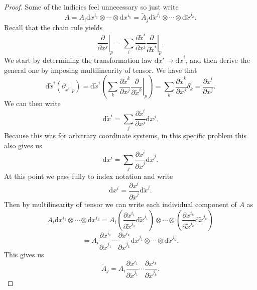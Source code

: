 \documentclass[11pt, letterpaper]{article}
\begin{document}
\begin{proof}
	Some of the indicies feel unnecessary so just write
	\[
		A=A_i \mathrm{d} x^{i_1} \otimes \cdots \otimes \mathrm{d} x^{i_k}  = \widetilde{A}_j \mathrm{d} \widetilde{x}^{j_1} \otimes \cdots \otimes \mathrm{d} \widetilde{x}^{j_k} 
	.\]
	Recall that the chain rule yields
	\[
		\left.\frac{\partial }{\partial x ^j} \right|_p = \sum_{i} \frac{\partial \widetilde{x} ^i}{\partial x^j} \left.\frac{\partial }{\partial \widetilde{x} ^i}\right|_p 
	.\]
	We start by determining the transformation law $\mathrm{d}x^i \to \mathrm{d} \widetilde{x} ^i $, and then derive the general one by imposing multilinearity of tensor. We have that
	\[
		\mathrm{d} \widetilde{x}^i(\partial _{x^{^j} } |_p)=\mathrm{d} \widetilde{x}^i \left( \sum_{k} \frac{\partial \widetilde{x} ^k}{\partial x ^j} \left.\frac{\partial }{\partial \widetilde{x}^k} \right|_p \right) =	\sum_{k} \frac{\partial \widetilde{x} ^k}{\partial x ^j} \delta ^i_k = \frac{\partial \widetilde{x}^i}{\partial x^j} 
	.\]
	We can then write
	\[
		\mathrm{d} \widetilde{x} ^i = \sum_{j} \frac{\partial \widetilde{x} ^i}{\partial x^j} \mathrm{d} x^j
	.\]
	Because this was for arbitrary coordinate systems, in this specific problem this also gives us
	\[
		\mathrm{d} x^i = \sum_{j} \frac{\partial x ^i}{\partial \widetilde{x}^j} \mathrm{d} \widetilde{x} ^j
	.\]
	At this point we pass fully to index notation and write
	\[
		\mathrm{d} x^i =  \frac{\partial x ^i}{\partial \widetilde{x}^j} \mathrm{d} \widetilde{x}^j
	.\]
	Then by multilinearity of tensor we can write each individual component of $A$ as
	\[
		A_i \mathrm{d} x^{i_1} \otimes \cdots \otimes \mathrm{d} x^{i_k} =A_i \left( \frac{\partial x ^{i_1}}{\partial \widetilde{x}^{j_1}} \mathrm{d} \widetilde{x}^{j_1}\right) \otimes \cdots \otimes \left( \frac{\partial x^{i_k}}{\partial \widetilde{x}^{j_k}} \mathrm{d} \widetilde{x}^{j_k}\right)
	\]
	\[
		=A_i \frac{\partial x^{i_1} }{\partial \widetilde{x} ^{j_1} } \cdots \frac{\partial x^{i_k} }{\partial \widetilde{x} ^{j_k} } \mathrm{d} \widetilde{x} ^{j_1} \otimes \cdots \otimes \mathrm{d} \widetilde{x} ^{j_k} 
	.\]
	This gives us
	\[
		\widetilde{A}_j=A_i \frac{\partial x^{i_1} }{\partial \widetilde{x} ^{j_1} } \cdots \frac{\partial x^{i_k} }{\partial \widetilde{x} ^{j_k} } 
	.\]
\end{proof}
\end{document}
